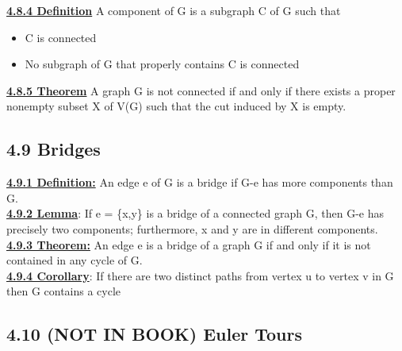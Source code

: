 \documentclass[12pt]{article}
\newcommand{\myt}[1]{\textbf{\underline{#1}}}
\begin{document}
	\myt{4.8.4 Definition} A component of G is a subgraph C of G such that\\
	\begin{itemize}
		\item C is connected
		\item No subgraph of G that properly contains C is connected
	\end{itemize}
	
	\myt{4.8.5 Theorem} A graph G is not connected if and only if there exists a proper nonempty subset X of V(G) such that the cut induced by X is empty.\\
	
	\subsection*{4.9 Bridges}
	\myt{4.9.1 Definition:} An edge e of G is a bridge if G-e has more components than G.\\
	
	\myt{4.9.2 Lemma}: If e = \{x,y\} is a bridge of a connected graph G, then G-e has precisely two components; furthermore, x and y are in different components.\\
	
	\myt{4.9.3 Theorem:} An edge e is a bridge of a graph G if and only if it is not contained in any cycle of G.\\
	
	\myt{4.9.4 Corollary}: If there are two distinct paths from vertex u to vertex v in G then G contains a cycle\\
	
	\subsection*{4.10 (NOT IN BOOK) Euler Tours}
	
	

	
\end{document}
